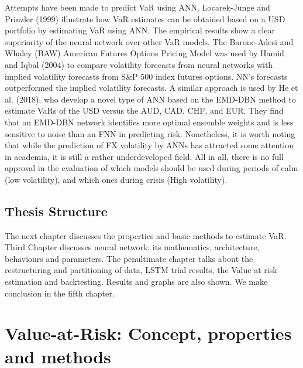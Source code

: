 \documentclass[a4paper,11pt,oneside]{book}
\begin{document}
\newline\newline
Attempts have been made to predict VaR using ANN. Locarek-Junge and Prinzler (1999) illustrate how VaR estimates can be obtained based on a USD portfolio by estimating VaR using ANN. The empirical results show a clear superiority of the neural network over other VaR models. The Barone-Adesi and Whaley (BAW) American Futures Options Pricing Model was used by Hamid and Iqbal (2004) to compare volatility forecasts from neural networks with implied volatility forecasts from S\&P 500 index futures options. NN's forecasts outperformed the implied volatility forecasts. A similar approach is used by He et al. (2018), who develop a novel type of ANN based on the EMD-DBN method to estimate VaRs of the USD versus the AUD, CAD, CHF, and EUR. They find that an EMD-DBN network identifies more optimal ensemble weights and is less sensitive to noise than an FNN in predicting risk. Nonetheless, it is worth noting that while the prediction of FX volatility by ANNs has attracted some attention in academia, it is still a rather underdeveloped field.
\newline\newline
All in all, there is no full approval in the evaluation of which models should be used during
periods of calm (low volatility), and which ones during crisis (High volatility).


\section{Thesis Structure}
The next chapter discusses the properties and basic methods to estimate VaR. Third Chapter discusses neural network: its mathematics, architecture, behaviours and parameters. The penultimate chapter talks about the restructuring and partitioning of data, LSTM trial results, the Value at risk estimation and backtesting. Results and graphs are also shown. We make conclusion in the fifth chapter.




\chapter{Value-at-Risk: Concept,  properties and methods}
\end{document}

